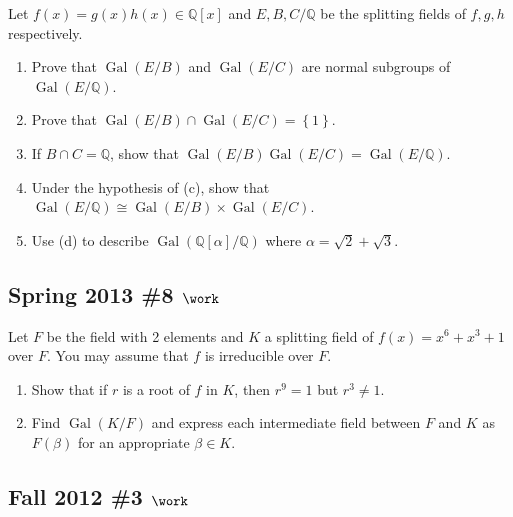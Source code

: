 Let \(f(x) = g(x) h(x) \in {\mathbb{Q}}[x]\) and \(E,B,C/{\mathbb{Q}}\)
be the splitting fields of \(f,g,h\) respectively.

\begin{enumerate}
\def\labelenumi{\alph{enumi}.}
\item
  Prove that \(\operatorname{Gal}(E/B)\) and \(\operatorname{Gal}(E/C)\)
  are normal subgroups of \(\operatorname{Gal}(E/{\mathbb{Q}})\).
\item
  Prove that
  \(\operatorname{Gal}(E/B) \cap\operatorname{Gal}(E/C) = \left\{{1}\right\}\).
\item
  If \(B\cap C = {\mathbb{Q}}\), show that
  \(\operatorname{Gal}(E/B) \operatorname{Gal}(E/C) = \operatorname{Gal}(E/{\mathbb{Q}})\).
\item
  Under the hypothesis of (c), show that
  \(\operatorname{Gal}(E/{\mathbb{Q}}) \cong \operatorname{Gal}(E/B) \times \operatorname{Gal}(E/C)\).
\item
  Use (d) to describe
  \(\operatorname{Gal}({\mathbb{Q}}[\alpha]/{\mathbb{Q}})\) where
  \(\alpha = \sqrt 2 + \sqrt 3\).
\end{enumerate}

\hypertarget{spring-2013-8-work}{%
\subsection{\texorpdfstring{Spring 2013 \#8
\(\work\)}{Spring 2013 \#8 \textbackslash work}}\label{spring-2013-8-work}}

Let \(F\) be the field with 2 elements and \(K\) a splitting field of
\(f(x) = x^6 + x^3 + 1\) over \(F\). You may assume that \(f\) is
irreducible over \(F\).

\begin{enumerate}
\def\labelenumi{\alph{enumi}.}
\item
  Show that if \(r\) is a root of \(f\) in \(K\), then \(r^9 = 1\) but
  \(r^3\neq 1\).
\item
  Find \(\operatorname{Gal}(K/F)\) and express each intermediate field
  between \(F\) and \(K\) as \(F(\beta)\) for an appropriate
  \(\beta \in K\).
\end{enumerate}

\hypertarget{fall-2012-3-work}{%
\subsection{\texorpdfstring{Fall 2012 \#3
\(\work\)}{Fall 2012 \#3 \textbackslash work}}\label{fall-2012-3-work}}

